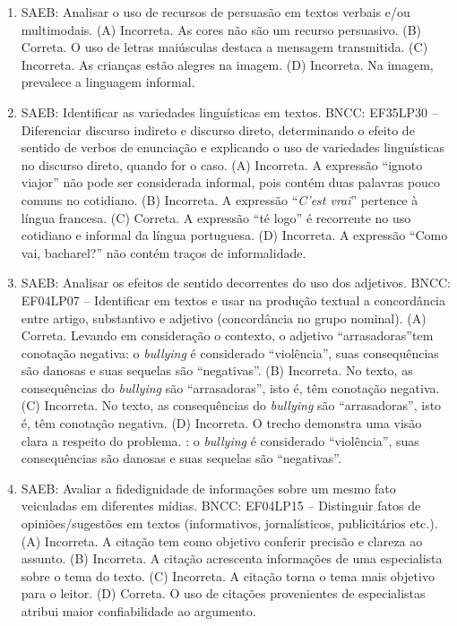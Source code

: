 \begin{enumerate}
\item
SAEB: Analisar o uso de recursos de persuasão em textos verbais e/ou multimodais. 
(A) Incorreta. As cores não são um recurso persuasivo. 
(B) Correta. O uso de letras maiúsculas destaca a mensagem transmitida. 
(C) Incorreta. As crianças estão alegres na imagem. 
(D) Incorreta. Na imagem, prevalece a linguagem informal.

\item
SAEB: Identificar as variedades linguísticas em textos. BNCC: EF35LP30 -- Diferenciar discurso indireto e discurso direto, determinando o efeito de sentido de verbos de enunciação e explicando o uso de variedades linguísticas no discurso direto, quando for o caso. 
(A) Incorreta. A expressão ``ignoto viajor'' não pode ser considerada informal, pois contém duas palavras pouco comuns no cotidiano. 
(B) Incorreta. A expressão ``\textit{C'est vrai}'' pertence à língua francesa. 
(C) Correta. A expressão ``té logo'' é recorrente no uso cotidiano e informal da língua portuguesa. 
(D) Incorreta. A expressão ``Como vai, bacharel?'' não contém traços de informalidade.

\item
SAEB: Analisar os efeitos de sentido decorrentes do uso dos adjetivos. BNCC: EF04LP07 -- Identificar em textos e usar na produção textual a concordância entre artigo, substantivo e adjetivo (concordância no grupo nominal). 
(A) Correta. Levando em consideração o contexto, o adjetivo ``arrasadoras''tem conotação negativa: o \textit{bullying} é considerado ``violência'', suas consequências são danosas e suas sequelas são ``negativas''. 
(B) Incorreta. No texto, as consequências do \textit{bullying} são ``arrasadoras'', isto é, têm conotação negativa. 
(C) Incorreta. No texto, as consequências do \textit{bullying} são ``arrasadoras'', isto é, têm conotação negativa. 
(D) Incorreta. O trecho demonstra uma visão clara a respeito do problema. : o \textit{bullying} é considerado ``violência'', suas consequências são danosas e suas sequelas são ``negativas''.

\item
SAEB: Avaliar a fidedignidade de informações sobre um mesmo fato veiculadas em diferentes mídias. BNCC: EF04LP15 -- Distinguir fatos de opiniões/sugestões em textos (informativos, jornalísticos, publicitários etc.). 
(A) Incorreta. A citação tem como objetivo conferir precisão e clareza ao assunto. 
(B) Incorreta. A citação acrescenta informações de uma especialista sobre o tema do texto. 
(C) Incorreta. A citação torna o tema mais objetivo para o leitor. 
(D) Correta. O uso de citações provenientes de especialistas atribui maior confiabilidade ao argumento.


\end{enumerate}
